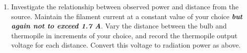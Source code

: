 \documentclass{article}
\begin{document}
\begin{enumerate}
\item \label{sec:PvsD}  Investigate the relationship between observed power and distance from the source.   Maintain the filament current at a constant value of your choice  {\bf \em but again not to exceed 1.7 A}.  Vary the distance between the bulb and thermopile in increments of your choice, and record the thermopile output voltage for each distance.   Convert this voltage to radiation power as above. 









\end{enumerate}
\end{document}
